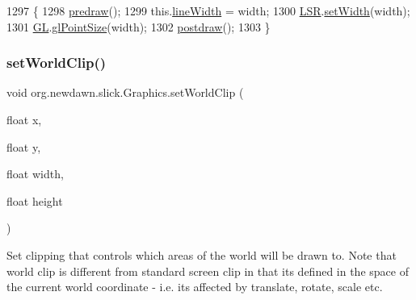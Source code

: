 \begin{DoxyCode}
1297                                           \{
1298         \mbox{\hyperlink{classorg_1_1newdawn_1_1slick_1_1_graphics_a7b4c203181e3b6302d51ed9b24596b8d}{predraw}}();
1299         this.\mbox{\hyperlink{classorg_1_1newdawn_1_1slick_1_1_graphics_a0f3d0e354937edf0872a2e79bc036b60}{lineWidth}} = width;
1300         \mbox{\hyperlink{classorg_1_1newdawn_1_1slick_1_1_graphics_a56cf9873aa4a26e824f6cd4232fdb3f0}{LSR}}.\mbox{\hyperlink{interfaceorg_1_1newdawn_1_1slick_1_1opengl_1_1renderer_1_1_line_strip_renderer_afc8159c0766c0d177b402cf311d9a7b8}{setWidth}}(width);
1301         \mbox{\hyperlink{classorg_1_1newdawn_1_1slick_1_1_graphics_a39ca68db81b225982a4421c4a6835eed}{GL}}.\mbox{\hyperlink{interfaceorg_1_1newdawn_1_1slick_1_1opengl_1_1renderer_1_1_s_g_l_a29b20d7b222979b3edb3f069db9ec467}{glPointSize}}(width);
1302         \mbox{\hyperlink{classorg_1_1newdawn_1_1slick_1_1_graphics_abe054371d1486618ff327bbbcf02ff97}{postdraw}}();
1303     \}
\end{DoxyCode}
\mbox{\label{classorg_1_1newdawn_1_1slick_1_1_graphics_a9239d1442a3ccdda9880e0a798c6494a}} 
\subsubsection{\texorpdfstring{set\+World\+Clip()}{setWorldClip()}\hspace{0.1cm}{\footnotesize\ttfamily [1/2]}}
{\footnotesize\ttfamily void org.\+newdawn.\+slick.\+Graphics.\+set\+World\+Clip (\begin{DoxyParamCaption}\item[{float}]{x,  }\item[{float}]{y,  }\item[{float}]{width,  }\item[{float}]{height }\end{DoxyParamCaption})\hspace{0.3cm}{\ttfamily [inline]}}

Set clipping that controls which areas of the world will be drawn to. Note that world clip is different from standard screen clip in that it\textquotesingle{}s defined in the space of the current world coordinate -\/ i.\+e. it\textquotesingle{}s affected by translate, rotate, scale etc.


